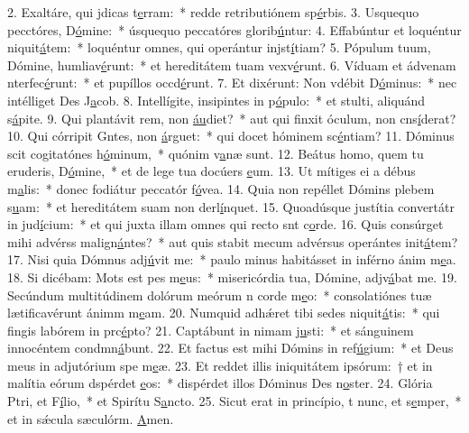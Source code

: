 2. Exaltáre, qui jdicas t\uline{e}rram:~* redde retributiónem sp\uline{é}rbis.
3. Usquequo pecctóres, D\uline{ó}mine:~* úsquequo peccatóres glorib\uline{ú}ntur:
4. Effabúntur et loquéntur niquit\uline{á}tem:~* loquéntur omnes, qui operántur injst\uline{í}tiam?
5. Pópulum tuum, Dómine, humliav\uline{é}runt:~* et hereditátem tuam vexv\uline{é}runt.
6. Víduam et ádvenam nterfec\uline{é}runt:~* et pupíllos occd\uline{é}runt.
7. Et dixérunt: Non vdébit D\uline{ó}minus:~* nec intélliget Des J\uline{a}cob.
8. Intellígite, insipintes in p\uline{ó}pulo:~* et stulti, aliquánd s\uline{á}pite.
9. Qui plantávit rem, non \uline{áu}diet?~* aut qui finxit óculum, non cns\uline{í}derat?
10. Qui córripit Gntes, non \uline{á}rguet:~* qui docet hóminem sc\uline{é}ntiam?
11. Dóminus scit cogitatónes h\uline{ó}minum,~* quónim v\uline{a}næ sunt.
12. Beátus homo, quem tu eruderis, D\uline{ó}mine,~* et de lege tua docúers \uline{e}um.
13. Ut mítiges ei a débus m\uline{a}lis:~* donec fodiátur peccatór f\uline{ó}vea.
14. Quia non repéllet Dómins plebem s\uline{u}am:~* et hereditátem suam non derl\uline{í}nquet.
15. Quoadúsque justítia convertátr in jud\uline{í}cium:~* et qui juxta illam omnes qui recto snt c\uline{o}rde.
16. Quis consúrget mihi advérss malign\uline{á}ntes?~* aut quis stabit mecum advérsus operántes init\uline{á}tem?
17. Nisi quia Dómnus adj\uline{ú}vit me:~* paulo minus habitásset in inférno ánim m\uline{e}a.
18. Si dicébam: Mots est pes m\uline{e}us:~* misericórdia tua, Dómine, adjv\uline{á}bat me.
19. Secúndum multitúdinem dolórum meórum n corde m\uline{e}o:~* consolatiónes tuæ lætificavérunt ánimm m\uline{e}am.
20. Numquid adhǽret tibi sedes niquit\uline{á}tis:~* qui fingis labórem in prc\uline{é}pto?
21. Captábunt in nimam j\uline{u}sti:~* et sánguinem innocéntem condmn\uline{á}bunt.
22. Et factus est mihi Dómins in ref\uline{ú}gium:~* et Deus meus in adjutórium spe m\uline{e}æ.
23. Et reddet illis iniquitátem ipsórum:~† et in malítia eórum dspérdet \uline{e}os:~* dispérdet illos Dóminus Des n\uline{o}ster.
24. Glória Ptri, et F\uline{í}lio,~* et Spirítu S\uline{a}ncto.
25. Sicut erat in princípio, t nunc, et s\uline{e}mper,~* et in sǽcula sæculórm. \uline{A}men.
